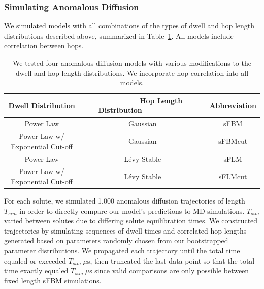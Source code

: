 \documentclass[aps,pre,preprint,groupedaddress,longbibliography]{revtex4-2}
\begin{document}
  \subsubsection*{Simulating Anomalous Diffusion}

  We simulated models with all combinations of the types of dwell and hop length
  distributions described above, summarized in Table~\ref{table:anomalous_models}.
  All models include correlation between hops.

  \begin{table}[!htb]
	  \centering
	  \begin{tabular}{ccc}
            \hline
	  \hline
	  Dwell Distribution                & ~~~~~~~~~Hop Length Distribution~~~~~~~~~~~ & Abbreviation \\
	  \hline
      Power Law                         & Gaussian                & sFBM         \\
      Power Law w/ Exponential Cut-off  & Gaussian                & sFBMcut      \\
      Power Law                         & L\'evy Stable           & sFLM         \\
      Power Law w/ Exponential Cut-off  & L\'evy Stable           & sFLMcut      \\
	  \hline
          \hline
	  \end{tabular}
	  \caption{We tested four anomalous diffusion models with various modifications 
	  to the dwell and hop length distributions. We incorporate hop correlation 
	  into all models.}\label{table:anomalous_models}
          
 \end{table}

  For each solute, we simulated 1,000 anomalous diffusion trajectories of
  length $T_{sim}$ in order to directly compare our model's predictions to MD
  simulations. $T_{sim}$ varied between solutes due to differing solute
  equilibration times. We constructed trajectories by simulating sequences of
  dwell times and correlated hop lengths generated based on parameters randomly
  chosen from our bootstrapped parameter distributions. We propagated each
  trajectory until the total time equaled or exceeded $T_{sim}~ \mu$s, then
  truncated the last data point so that the total time exactly equaled
  $T_{sim}~ \mu$s since valid comparisons are only possible between fixed
  length sFBM simulations. 
  
\end{document}
